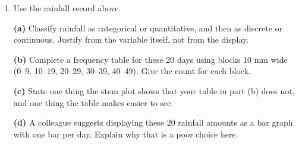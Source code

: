 \documentclass[12pt]{article}
\begin{document}
\begin{enumerate}[leftmargin=1.9em, itemsep=0.16in, resume]

  \item Use the rainfall record above.

        \boxguard[17]
        \vspace{6pt}
        \textbf{(a)} Classify rainfall as categorical or quantitative, and then as discrete or
        continuous. Justify from the variable itself, not from the display.\\[4pt]

        \boxguard[17]
        \vspace{6pt}
        \textbf{(b)} Complete a frequency table for these 20 days using blocks 10 mm wide
        (0--9, 10--19, 20--29, 30--39, 40--49). Give the count for each block.\\[4pt]

        \boxguard[17]
        \vspace{6pt}
        \textbf{(c)} State one thing the stem plot shows that your table in part (b) does not,
        and one thing the table makes easier to see.\\[4pt]

        \boxguard[17]
        \vspace{6pt}
        \textbf{(d)} A colleague suggests displaying these 20 rainfall amounts as a bar graph
        with one bar per day. Explain why that is a poor choice here.\\[4pt]

\end{enumerate}
\end{document}
